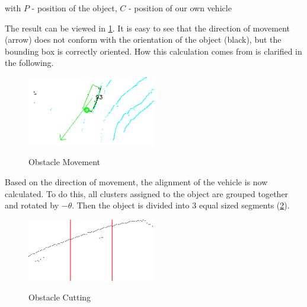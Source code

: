 \documentclass[11pt,oneside,openright]{mpreport}
\begin{document}
with $P$ - position of the object, $C$ - position of our own vehicle


The result can be viewed in \cref{obst_rot}. It is easy to see that the direction of movement (arrow) does not conform with the orientation of the object (black), 
but the bounding box is correctly oriented. How this calculation comes from is clarified in the following.

\begin{figure}[!ht]
\begin{center}
\caption{Obstacle Movement}
\includegraphics[width=0.5\textwidth]{bilder/obst_rot.png}
\label{obst_rot}
\end{center}
\end{figure}


Based on the direction of movement, the alignment of the vehicle is now calculated. To do this, all clusters assigned to the object are grouped together and rotated by $-\theta$.
Then the object is divided into 3 equal sized segments (\cref{obst_devide}).

\begin{figure}[!ht]
\begin{center}
\caption{Obstacle Cutting}
\includegraphics[width=0.5\textwidth]{bilder/obst_devide.png}
\label{obst_devide}
\end{center}
\end{figure}
\end{document}
